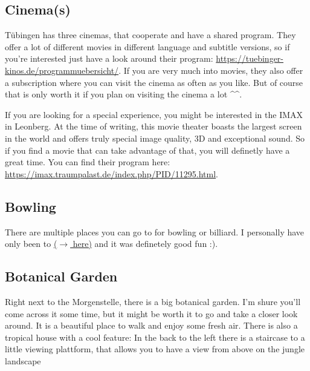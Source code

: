 \subsection{Cinema(s)}
Tübingen has three cinemas, that cooperate and have a shared program. They offer a lot of different movies in different language and subtitle versions, so if you're interested just have a look around their program: \url{https://tuebinger-kinos.de/programmuebersicht/}.
If you are very much into movies, they also offer a subscription where you can visit the cinema as often as you like. But of course that is only worth it if you plan on visiting the cinema a lot \^{}\^{}.

If you are looking for a special experience, you might be interested in the IMAX in Leonberg. At the time of writing, this movie theater boasts the largest screen in the world and offers truly special image quality, 3D and exceptional sound. So if you find a movie that can take advantage of that, you will definetly have a great time. You can find their program here: \url{https://imax.traumpalast.de/index.php/PID/11295.html}.

\subsection{Bowling}
There are multiple places you can go to for bowling or billiard. I personally have only been to  \href{https://maps.app.goo.gl/dgMVABnYTJC7qGBT8}{($\xrightarrow{}$ here)} and it was definetely good fun :). 

\subsection{Botanical Garden}
Right next to the Morgenstelle, there is a big botanical garden. I'm shure you'll come across it some time, but it might be worth it to go and take a closer look around. It is a beautiful place to walk and enjoy some fresh air. There is also a tropical house with a cool feature: In the back to the left there is a staircase to a little viewing plattform, that allows you to have a view from above on the jungle landscape